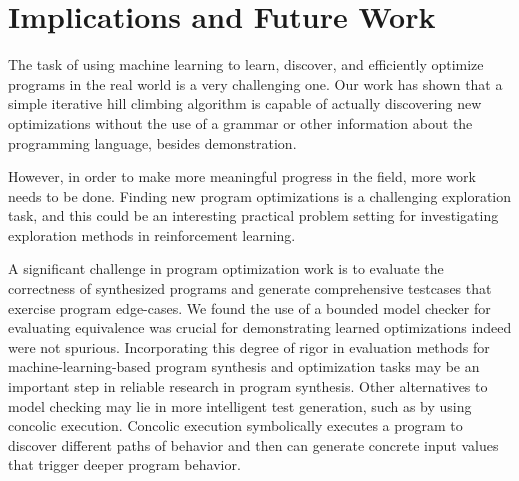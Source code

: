 \documentclass{article}
\begin{document}
\section{Implications and Future Work}

The task of using machine learning to learn, discover, and efficiently optimize programs in the real world is a very challenging one. Our work has shown that a simple iterative hill climbing algorithm is capable of actually discovering new optimizations without the use of a grammar or other information about the programming language, besides demonstration. 

However, in order to make more meaningful progress in the field, more work needs to be done. Finding new program optimizations is a challenging exploration task, and this could be an interesting practical problem setting for investigating exploration methods in reinforcement learning. 

A significant challenge in program optimization work is to evaluate the correctness of synthesized programs and generate comprehensive testcases that exercise program edge-cases. We found the use of a bounded model checker for evaluating equivalence was crucial for demonstrating learned optimizations indeed were not spurious. Incorporating this degree of rigor in evaluation methods for machine-learning-based program synthesis and optimization tasks may be an important step in reliable research in program synthesis. Other alternatives to model checking may lie in more intelligent test generation, such as by using concolic execution.  Concolic execution symbolically executes a program to discover different paths of behavior and then can generate concrete input values that trigger deeper program behavior. 
\end{document}
